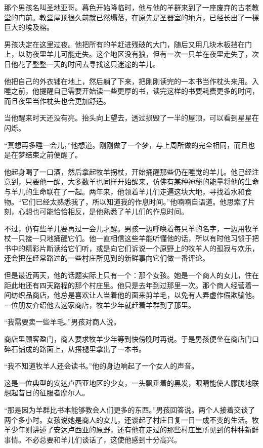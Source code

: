 \documentclass[twoside,openany]{book}
\begin{document}
那个男孩名叫圣地亚哥。暮色开始降临时，他与他的羊群来到了一座废弃的古老教堂的门前。教堂屋顶很久前就已然塌落，在原先是圣器室的地方，已经长出了一棵巨大的埃及榕。

男孩决定在这里过夜。他把所有的羊赶进残破的大门，随后又用几块木板挡在门上，以防夜里羊儿可能走失。这个地区没有狼，但有一次一只羊在夜里走失了，次日他花了整整一天的时间去寻找这只迷途的羊儿。

他把自己的外衣铺在地上，然后躺了下来，把刚刚读完的一本书当作枕头来用。入睡之前，他提醒自己需要开始读一些更厚的书，读完这样的书要耗费更多的时间，而且夜里当作枕头也会更加舒适。

当他醒来时天还没有亮。抬头向上望去，透过损毁了一半的屋顶，可以看到星星在闪烁。

“真想再多睡一会儿，”他想道。刚刚做了一个梦，与上周所做的完全相同，而且也是在梦结束之前便醒了。

他起身喝了一口酒，然后拿起牧羊拐杖，开始捅醒那些仍在睡觉的羊儿。他己经注意到，只要他一醒，大多数羊也同样开始醒来，仿佛有某种神秘的能量将他的生命与羊儿的生命联在了一起。两年来，他领着羊儿们走遍这块大地，寻找着水和食物。“它们已经太熟悉我了，所以知道我的作息时间。”他喃喃自语道。他思索了片刻，心想也可能恰恰相反，是他熟悉了羊儿们的作息时间。

不过，仍有些羊儿要再过一会儿才醒。男孩一边呼唤着每只羊的名字，一边用牧羊杖一只接一只地捅醒它们。他一直相信这些羊能听懂他的话，所以有时他习惯于把书中的精彩片断读给它们听，或是向它们诉说一个原野上的牧羊人的孤寂与欢乐，还会把在经常路过的一些村庄所见到的新鲜事向它们做一番评论。

但是最近两天，他的话题实际上只有一个：那个女孩。她是一个商人的女儿，住在距此地还有四天路程的那个村庄里。他只是去年到过那里一次。那个商人经营着一间纺织品商店，他总是喜欢让人当着他的面来剪羊毛，以免有人弄虚作假欺骗他。一位朋友介绍他去这家商店，牧羊少年就赶着羊群到了那里。

“我需要卖一些羊毛。”男孩对商人说。

商店里顾客盈门，商人要求牧羊少年等到快傍晚时再说。于是男孩便坐在商店门口碎石铺成的路面上，从搭褪里拿出了一本书。

“我不知道牧羊人还会读书。”他的身边响起了一个女人的声音。

这是一位典型的安达卢西亚地区的少女，一头飘垂着的黑发，眼睛能使人朦胧地联想起昔日的征服者摩尔人。

“那是因为羊群比书本能够教会人们更多的东西。”男孩回答说。两个人接着交谈了两个多小时。女孩说她是商人的女儿，还谈起了村庄日复一日一成不变的生活。牧羊少年则讲述了安达卢西亚的原野，还有他在走过的那些村庄里所见到的种种新鲜事情。不必总要和羊儿们谈话了，这使他感到十分高兴。
\end{document}
